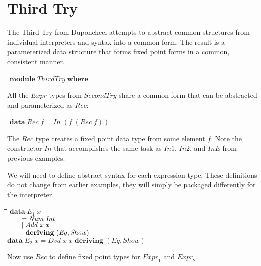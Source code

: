 \documentclass[10pt]{article}
\newlength{\lwidth}\setlength{\lwidth}{4.5cm}
\newlength{\cwidth}\setlength{\cwidth}{8mm} %
\newcommand{\Conid}[1]{\mathit{#1}}
\newcommand{\Varid}[1]{\mathit{#1}}
\begin{document}
\section{Third Try}

The Third Try from Duponcheel attempts to abstract common structures
from individual interpreters and syntax into a common form.  The
result is a parameterized data structure that forms fixed point forms
in a common, consistent manner.

\begin{tabbing}
\qquad\=\hspace{\lwidth}\=\hspace{\cwidth}\=\+\kill
${\mathbf{module}\;\Conid{ThirdTry}\;\mathbf{where}}$
\end{tabbing}
All the \ensuremath{\Conid{Expr}} types from \ensuremath{\Conid{SecondTry}} share a common form that can be
abstracted and parameterized as \ensuremath{\Conid{Rec}}:

\begin{tabbing}
\qquad\=\hspace{\lwidth}\=\hspace{\cwidth}\=\+\kill
${\mathbf{data}\;\Conid{Rec}\;\Varid{f}\mathrel{=}\Conid{In}\;(\Varid{f}\;(\Conid{Rec}\;\Varid{f}))}$
\end{tabbing}
The \ensuremath{\Conid{Rec}} type creates a fixed point data type from some element \ensuremath{\Varid{f}}.
Note the constructor \ensuremath{\Conid{In}} that accomplishes the same task as \ensuremath{\Conid{In1}},
\ensuremath{\Conid{In2}}, and \ensuremath{\Conid{InE}} from previous examples.

We will need to define abstract syntax for each expression type.
These definitions do not change from earlier examples, they will
simply be packaged differently for the interpreter.

\begin{tabbing}
\qquad\=\hspace{\lwidth}\=\hspace{\cwidth}\=\+\kill
${\mathbf{data}\;\Varid{E}_1\;\Varid{x}}$\\
${\hskip2.00em\relax\mathrel{=}\Conid{Num}\;\Conid{Int}}$\\
${\hskip2.00em\relax\mid \Conid{Add}\;\Varid{x}\;\Varid{x}}$\\
${\hskip2.00em\relax\phantom{\mid \mbox{}}\mathbf{deriving}\;(\Conid{Eq},\Conid{Show})}$\\
${}$\\
${\mathbf{data}\;\Varid{E}_2\;\Varid{x}\mathrel{=}\Conid{Dvd}\;\Varid{x}\;\Varid{x}\;\mathbf{deriving}\;(\Conid{Eq},\Conid{Show})}$
\end{tabbing}
Now use \ensuremath{\Conid{Rec}} to define fixed point types for \ensuremath{\Varid{Expr}_1} and \ensuremath{\Varid{Expr}_2}.
\end{document}
